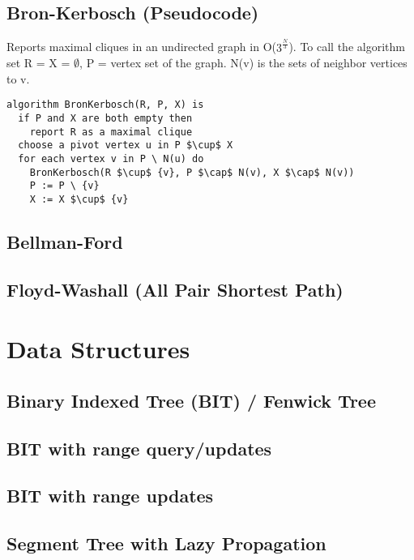 \documentclass[9pt]{extarticle}
\begin{document}
\begin{multicols*}{3}
\subsection{Bron-Kerbosch (Pseudocode)}
Reports maximal cliques in an undirected graph in O($3^{\frac{N}{3}}$).
To call the algorithm set R = X = $\emptyset$, P = vertex set of the graph.
N(v) is the sets of neighbor vertices to v.
\begin{lstlisting}[mathescape=true]
algorithm BronKerbosch(R, P, X) is
  if P and X are both empty then
    report R as a maximal clique
  choose a pivot vertex u in P $\cup$ X
  for each vertex v in P \ N(u) do
    BronKerbosch(R $\cup$ {v}, P $\cap$ N(v), X $\cap$ N(v))
    P := P \ {v}
    X := X $\cup$ {v}
\end{lstlisting}

\subsection{Bellman-Ford}


\subsection{Floyd-Washall (All Pair Shortest Path)}


\section{Data Structures}

\subsection{Binary Indexed Tree (BIT) / Fenwick Tree} %


\subsection{BIT with range query/updates}


\subsection{BIT with range updates} %


\subsection{Segment Tree with Lazy Propagation} %



\end{multicols*}
\end{document}
